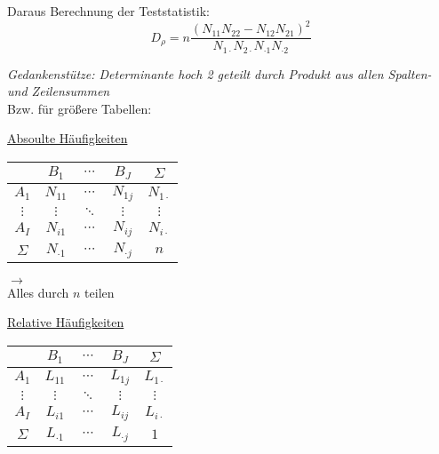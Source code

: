 Daraus Berechnung der Teststatistik:
\begin{equation*}
    D_{\rho} = n \frac{(N_{11}N_{22}-N_{12}N_{21})^2}{N_{1\cdot}N_{2\cdot}N_{\cdot1}N_{\cdot2}}
\end{equation*}

\emph{Gedankenstütze: Determinante hoch 2 geteilt durch Produkt aus allen Spalten- und Zeilensummen}\\

Bzw. für größere Tabellen:\\

\begin{minipage}[c]{0.4\textwidth}
    \centering
    \underline{Absoulte Häufigkeiten}\\

    \begin{tabular}{c|ccc|c}
             & $B_1$        & $\cdots$ & $B_J$         & $\Sigma$ \\ 
    \hline
    $A_1$    & $N_{11}$     & $\cdots$ & $N_{1j}$      & $N_{1\cdot}$ \\
    $\vdots$ & $\vdots$     & $\ddots$ & $\vdots$      & $\vdots$ \\
    $A_I$    & $N_{i1}    $ & $\cdots$ & $N_{ij}$      & $N_{i\cdot}$ \\
    \hline
    $\Sigma$ & $N_{\cdot1}$ & $\cdots$ & $N_{\cdot j}$ & $n$ \\
    \end{tabular}
\end{minipage}
\hfill
\begin{minipage}[c]{0.1\textwidth}
    \centering
    $\longrightarrow$\\
    Alles durch $n$ teilen
\end{minipage}
\hfill
\begin{minipage}[c]{0.4\textwidth}
    \centering
    \underline{Relative Häufigkeiten}\\
    
    \begin{tabular}{c|ccc|c}
             & $B_1$        & $\cdots$ & $B_J$         & $\Sigma$ \\ 
    \hline
    $A_1$    & $L_{11}$     & $\cdots$ & $L_{1j}$      & $L_{1\cdot}$ \\
    $\vdots$ & $\vdots$     & $\ddots$ & $\vdots$      & $\vdots$ \\
    $A_I$    & $L_{i1}    $ & $\cdots$ & $L_{ij}$      & $L_{i\cdot}$ \\
    \hline
    $\Sigma$ & $L_{\cdot1}$ & $\cdots$ & $L_{\cdot j}$ & $1$ \\
    \end{tabular}
\end{minipage}\\


